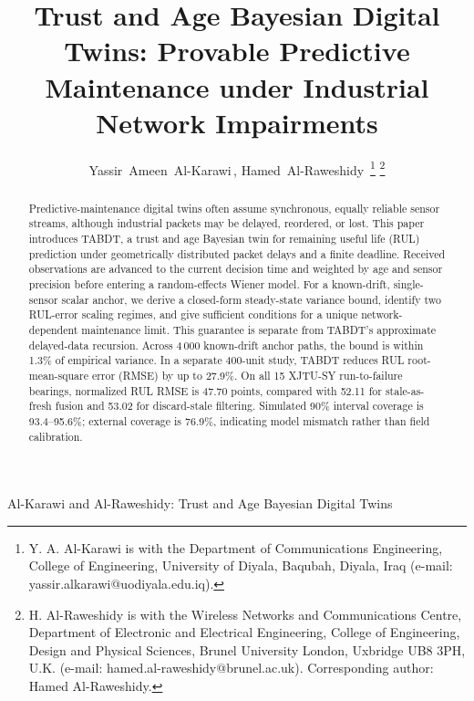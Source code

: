 \documentclass[journal]{IEEEtran}
\begin{document}
\title{Trust and Age Bayesian Digital Twins: Provable Predictive Maintenance
under Industrial Network Impairments}

\author{Yassir~Ameen~Al-Karawi\,,
Hamed~Al-Raweshidy\,%
\thanks{Y. A. Al-Karawi is with the Department of Communications
Engineering, College of Engineering, University of Diyala, Baqubah, Diyala,
Iraq (e-mail: yassir.alkarawi@uodiyala.edu.iq).}%
\thanks{H. Al-Raweshidy is with the Wireless Networks and Communications
Centre, Department of Electronic and Electrical Engineering, College of
Engineering, Design and Physical Sciences, Brunel University London,
Uxbridge UB8 3PH, U.K. (e-mail: hamed.al-raweshidy@brunel.ac.uk).
Corresponding author: Hamed Al-Raweshidy.}}

%
{Al-Karawi and Al-Raweshidy: Trust and Age Bayesian Digital Twins}

\maketitle

\begin{abstract}
Predictive-maintenance digital twins often assume synchronous, equally
reliable sensor streams, although industrial packets may be delayed,
reordered, or lost. This paper introduces TABDT, a trust and age Bayesian
twin for remaining useful life (RUL) prediction under geometrically
distributed packet delays and a finite deadline. Received observations are
advanced to the current decision
time and weighted by age and sensor precision before entering a random-effects
Wiener model. For a known-drift, single-sensor scalar anchor, we derive a closed-form
steady-state variance bound, identify two RUL-error scaling regimes, and give
sufficient conditions for a unique network-dependent maintenance limit. This
guarantee is separate from TABDT's approximate delayed-data recursion. Across
4\,000 known-drift anchor paths, the bound is within 1.3\% of empirical
variance. In a separate 400-unit study, TABDT reduces RUL root-mean-square
error (RMSE) by up to 27.9\%. On all 15
XJTU-SY run-to-failure bearings, normalized RUL RMSE is 47.70 points,
compared with 52.11 for stale-as-fresh fusion and 53.02 for discard-stale
filtering. Simulated 90\% interval coverage is
93.4--95.6\%; external coverage is 76.9\%, indicating model mismatch rather
than field calibration.
\end{abstract}
\end{document}
